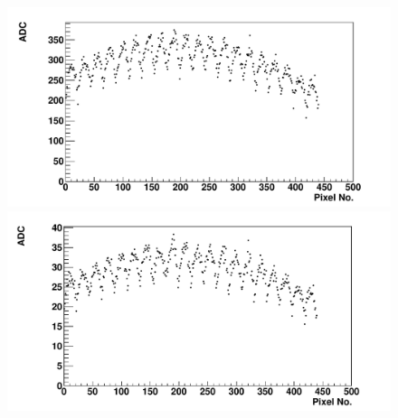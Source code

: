 \begin{figure} %
\includegraphics[width=\textwidth]{chapters/graphs/GainVarsMeas/LL_m04_2016-06-11/Set0and2/meanHist_StandHV_Pairs_set0and2.pdf}
\caption{}
\vspace{3mm}
\includegraphics[width=\textwidth]{chapters/graphs/GainVarsMeas/LL_m04_2016-06-11/Set0and2/meanHist_LowHV_Pairs_set0and2.pdf}
\caption{}
\end{figure}

